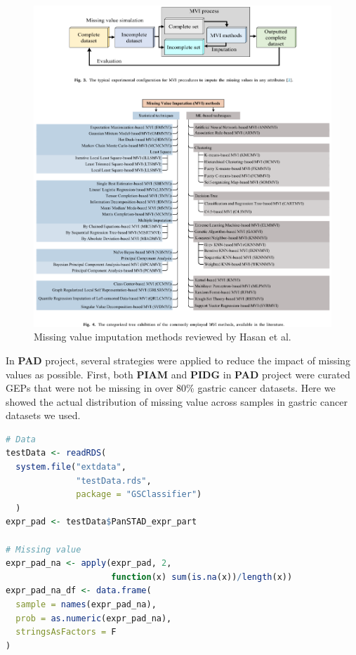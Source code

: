 \documentclass[
  12pt,
]{book}
\begin{document}
\begin{figure}

{\centering \includegraphics[width=0.9\linewidth]{./fig/mvi-01} 

}

\caption{Missing value imputation methods reviewed by Hasan et al.}\label{fig:mvi01}
\end{figure}

In \textbf{PAD} project, several strategies were applied to reduce the impact of missing values as possible. First, both \textbf{PIAM} and \textbf{PIDG} in \textbf{PAD} project were curated GEPs that were not be missing in over 80\% gastric cancer datasets. Here we showed the actual distribution of missing value across samples in gastric cancer datasets we used.

\begin{lstlisting}[language=R]
# Data
testData <- readRDS(
  system.file("extdata", 
              "testData.rds", 
              package = "GSClassifier")
  )
expr_pad <- testData$PanSTAD_expr_part

# Missing value
expr_pad_na <- apply(expr_pad, 2, 
                     function(x) sum(is.na(x))/length(x))
expr_pad_na_df <- data.frame(
  sample = names(expr_pad_na),
  prob = as.numeric(expr_pad_na),
  stringsAsFactors = F
)
\end{lstlisting}
\end{document}
